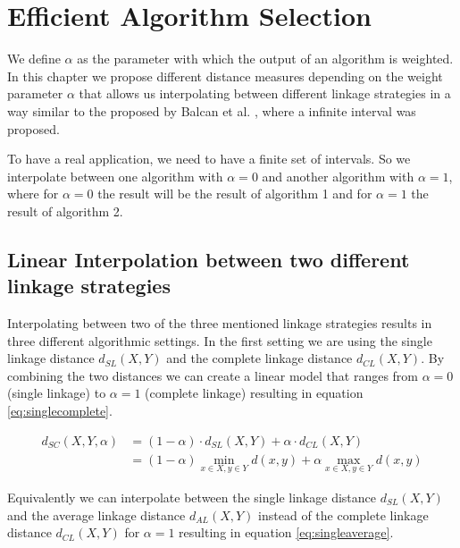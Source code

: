 \chapter{Efficient Algorithm Selection}
\label{chapter:alphalinkage}


We define $\alpha$ as the parameter with which the output of an algorithm is weighted. In this chapter we propose different distance measures depending on the weight parameter $\alpha$ that allows us interpolating between different linkage strategies in a way similar to the proposed by Balcan et al. \cite{DBLP:journals/corr/BalcanNVW16}, where a infinite interval was proposed.

To have a real application, we need to have a finite set of intervals. So we interpolate between one algorithm with $\alpha = 0$ and another algorithm with $\alpha = 1$, where for $\alpha = 0$ the result will be the result of algorithm 1 and for $\alpha = 1$ the result of algorithm 2.

\section{Linear Interpolation between two different linkage strategies}

Interpolating between two of the three mentioned linkage strategies results in three different algorithmic settings. In the first setting we are using the single linkage distance $d_{SL}(X,Y)$ and the complete linkage distance $d_{CL}(X,Y)$. By combining the two distances we can create a linear model that ranges from $\alpha = 0$ (single linkage) to $\alpha = 1$ (complete linkage) resulting in equation \ref{eq:singlecomplete}.

\begin{equation}
    \begin{aligned}
        d_{SC}(X,Y,\alpha) &= (1 - \alpha) \cdot d_{SL}(X,Y) + \alpha \cdot d_{CL}(X,Y)\\
        &= (1 - \alpha) \min\limits_{x \in X, y \in Y} d(x,y) + \alpha \max\limits_{x \in X, y \in Y} d(x,y)
    \end{aligned}
    \label{eq:singlecomplete}
\end{equation}

Equivalently we can interpolate between the single linkage distance $d_{SL}(X,Y)$ and the average linkage distance $d_{AL}(X,Y)$ instead of the complete linkage distance $d_{CL}(X,Y)$ for $\alpha = 1$ resulting in equation \ref{eq:singleaverage}. 

